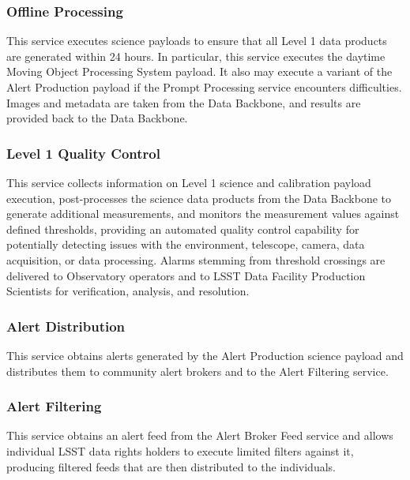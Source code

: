 \documentclass[DM,lsstdraft,toc]{lsstdoc}
\begin{document}
\subsubsection{Offline Processing}\label{offline-processing}

This service executes science payloads to ensure that all Level 1 data
products are generated within 24 hours. In particular, this service
executes the daytime Moving Object Processing System payload. It also
may execute a variant of the Alert Production payload if the Prompt
Processing service encounters difficulties. Images and metadata are
taken from the Data Backbone, and results are provided back to the Data
Backbone.

\subsubsection{Level 1 Quality Control}\label{level-1-quality-control}

This service collects information on Level 1 science and calibration
payload execution, post-processes the science data products from the
Data Backbone to generate additional measurements, and monitors the
measurement values against defined thresholds, providing an automated
quality control capability for potentially detecting issues with the
environment, telescope, camera, data acquisition, or data processing.
Alarms stemming from threshold crossings are delivered to Observatory
operators and to LSST Data Facility Production Scientists for
verification, analysis, and resolution.

\subsubsection{Alert Distribution}\label{alert-distribution}

This service obtains alerts generated by the Alert Production science
payload and distributes them to community alert brokers and to the Alert
Filtering service.

\subsubsection{Alert Filtering}\label{alert-filtering}

This service obtains an alert feed from the Alert Broker Feed service
and allows individual LSST data rights holders to execute limited
filters against it, producing filtered feeds that are then distributed
to the individuals.
\end{document}
